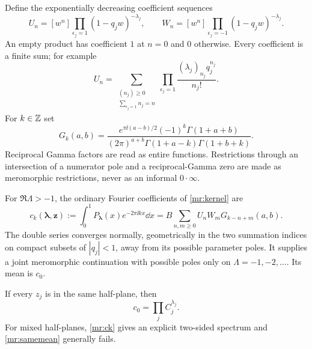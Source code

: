 Define the exponentially decreasing coefficient sequences
\begin{equation}\label{mr:UV}
 U_n=[w^n]\prod_{\epsilon_j=1}(1-q_jw)^{-\lambda_j},\qquad
 W_n=[w^n]\prod_{\epsilon_j=-1}(1-q_jw)^{-\lambda_j}.
\end{equation}
An empty product has coefficient $1$ at $n=0$ and $0$ otherwise.
Every coefficient is a finite sum; for example
\[
 U_n=\sum_{\substack{(n_j)\ge0\\\sum_{\epsilon_j=1}n_j=n}}
          \prod_{\epsilon_j=1}\frac{(\lambda_j)_{n_j}q_j^{n_j}}{n_j!}.
\]
For $k\in\mathbb Z$ set
\begin{equation}\label{mr:Gk}
 G_k(a,b)=
 \frac{e^{\pi\ii(a-b)/2}(-1)^k\Gamma(1+a+b)}
 {(2\pi)^{a+b}\Gamma(1+a-k)\Gamma(1+b+k)}.
\end{equation}
Reciprocal Gamma factors are read as entire functions. Restrictions
through an intersection of a numerator pole and a reciprocal-Gamma zero
are made as meromorphic restrictions, never as an informal $0\cdot\infty$.

\begin{theorem}
\label{mr:fourier}
For $\Re\Lambda>-1$, the ordinary Fourier coefficients of
\eqref{mr:kernel} are
\begin{equation}\label{mr:ck}
 c_k(\boldsymbol\lambda,\mathbf z)
   :=\int_0^1P_{\boldsymbol\lambda}(x)e^{-2\pi\ii kx}\dd x
   =B\sum_{n,m\ge0}U_nW_mG_{k-n+m}(a,b).
\end{equation}
The double series converges normally, geometrically in the two summation
indices on compact subsets of $|q_j|<1$, away from its possible parameter
poles. It supplies a joint meromorphic continuation with possible poles
only on $\Lambda=-1,-2,\ldots$. Its mean is $c_0$.

If every $z_j$ is in the same half-plane, then
\begin{equation}\label{mr:samemean}
                         c_0=\prod_jC_j^{\lambda_j}.
\end{equation}
For mixed half-planes, \eqref{mr:ck} gives an explicit two-sided
spectrum and \eqref{mr:samemean} generally fails.
\end{theorem}

